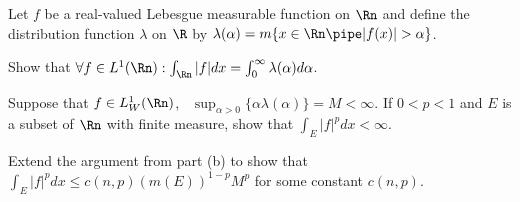 Let $f$ be a real-valued Lebesgue measurable function on $\Rn$ and
define the distribution function $\lambda$ on $\R$ 
by $\lambda(\alpha)=m\{x\in \Rn \pipe |f(x)|>\alpha\}$.
\begin{alist}
\item Show that $\forall f\in L^1(\Rn):\int_{\Rn}|f|dx
=\int_0^{\infty}\lambda(\alpha)d\alpha$.
\item Suppose that $f\in L^1_W(\Rn)$, \ie\ $\sup_{\alpha>0} \{\alpha
\lambda(\alpha)\}=M<\infty$. If $0<p<1$ and $E$ is a subset
of $\Rn$ with finite measure, show that $\int_{E}|f|^p dx<\infty$.
\item Extend the argument from part (b) to show that $\int_E|f|^p
dx\leq c(n,p)(m(E))^{1-p}M^p$ for some constant $c(n,p)$.
\end{alist}
